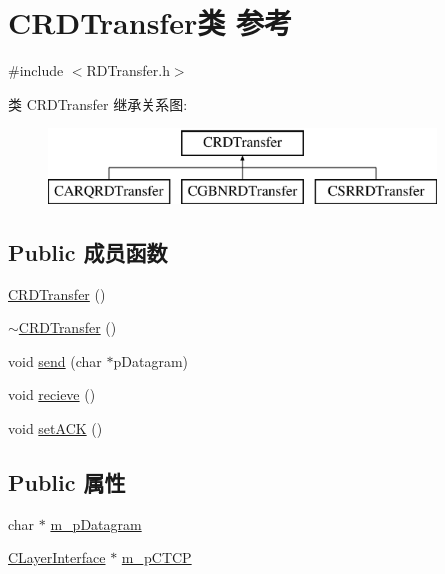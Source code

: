\hypertarget{class_c_r_d_transfer}{}\section{C\+R\+D\+Transfer类 参考}
\label{class_c_r_d_transfer}


{\ttfamily \#include $<$R\+D\+Transfer.\+h$>$}

类 C\+R\+D\+Transfer 继承关系图\+:\begin{figure}[H]
\begin{center}
\leavevmode
\includegraphics[height=2.000000cm]{class_c_r_d_transfer}
\end{center}
\end{figure}
\subsection*{Public 成员函数}
\begin{DoxyCompactItemize}
\item 
\hyperlink{class_c_r_d_transfer_ae2bd51f66b8f6f06c9281ad7c37953d2}{C\+R\+D\+Transfer} ()
\item 
\hyperlink{class_c_r_d_transfer_a00d630de9eac871b26ff845c1d93034a}{$\sim$\+C\+R\+D\+Transfer} ()
\item 
void \hyperlink{class_c_r_d_transfer_ac98920ca7fa69b7d4ad47587a860e3f5}{send} (char $\ast$p\+Datagram)
\item 
void \hyperlink{class_c_r_d_transfer_ae2d67458270389e3eef329bbdfac8a7a}{recieve} ()
\item 
void \hyperlink{class_c_r_d_transfer_a35f5c58df35d4c513e5172d41e7707e0}{set\+A\+CK} ()
\end{DoxyCompactItemize}
\subsection*{Public 属性}
\begin{DoxyCompactItemize}
\item 
char $\ast$ \hyperlink{class_c_r_d_transfer_a0ea73d394ba8b738de5d151b22425be6}{m\+\_\+p\+Datagram}
\item 
\hyperlink{class_c_layer_interface}{C\+Layer\+Interface} $\ast$ \hyperlink{class_c_r_d_transfer_a738fa552807680744a202da502ec61fa}{m\+\_\+p\+C\+T\+CP}
\end{DoxyCompactItemize}


